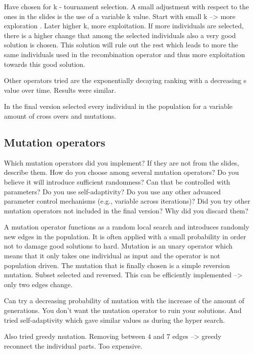 \documentclass[a4paper,10pt]{article}
\newcommand{\ReplaceMe}[1]{{\color{blue}#1}}
\begin{document}
Have chosen for k - tournament selection. A small adjustment with respect to the ones in the slides is the use of a variable k value. Start with small k --> more exploration . Later higher k, more exploitation. If more individuals are selected, there is a higher change that among the selected individuals also a very good solution is chosen. This solution will rule out the rest which leads to more the same individuals used in the recombination operator and thus more exploitation towards this good solution. 

Other operators tried are the exponentially decaying ranking with a decreasing s value over time. Results were similar. 

In the final version selected every individual in the population for a variable amount of cross overs and mutations. 




\subsection{Mutation operators}

\ReplaceMe{Which mutation operators did you implement? If they are not from the slides, describe them. How do you choose among several mutation operators? Do you believe it will introduce sufficient randomness? Can that be controlled with parameters? Do you use self-adaptivity? Do you use any other advanced parameter control mechanisms (e.g., variable across iterations)? Did you try other mutation operators not included in the final version? Why did you discard them?}

A mutation operator functions as a random local search and introduces randomly new edges in the population. It is often applied with a small probability in order not to damage good solutions to hard. Mutation is an unary operator which means that it only takes one individual as input and the operator is not population driven.
The mutation that is finally chosen is a simple reversion mutation. Subset selected and reversed. This can be efficiently implemented --> only two edges change. 

Can try a decreasing probability of mutation with the increase of the amount of generations. You don't want the mutation operator to ruin your solutions. And tried self-adaptivity which gave similar values as during the hyper search. 

Also tried greedy mutation. Removing between $4$ and $7$ edges --> greedy reconnect the individual parts. Too expensive. 
\end{document}
